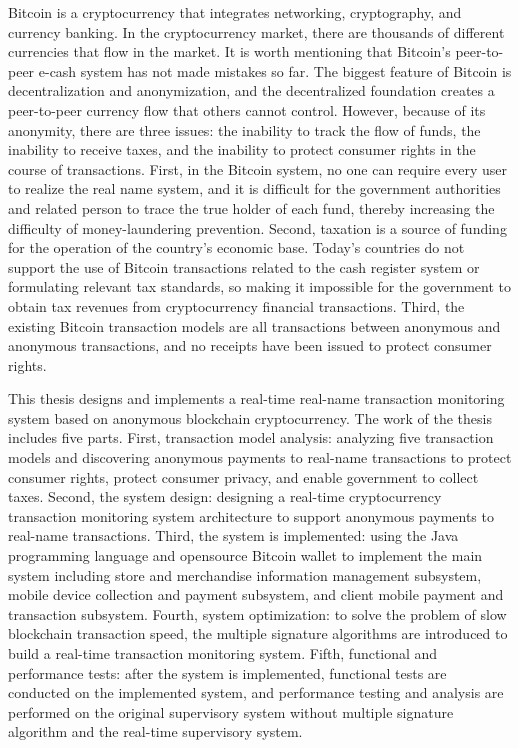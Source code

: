 \begin{eabstract}
	Bitcoin is a cryptocurrency that integrates networking, cryptography, and currency banking. In the cryptocurrency market, there are thousands of different currencies that flow in the market. It is worth mentioning that Bitcoin's peer-to-peer e-cash system has not made mistakes so far. The biggest feature of Bitcoin is decentralization and anonymization, and the decentralized foundation creates a peer-to-peer currency flow that others cannot control. However, because of its anonymity, there are three issues: the inability to track the flow of funds, the inability to receive taxes, and the inability to protect consumer rights in the course of transactions. First, in the Bitcoin system, no one can require every user to realize the real name system, and it is difficult for the government authorities and related person to trace the true holder of each fund, thereby increasing the difficulty of money-laundering prevention. Second, taxation is a source of funding for the operation of the country’s economic base. Today’s countries do not support the use of Bitcoin transactions related to the cash register system or formulating relevant tax standards, so making it impossible for the government to obtain tax revenues from cryptocurrency financial transactions. Third, the existing Bitcoin transaction models are all transactions between anonymous and anonymous transactions, and no receipts have been issued to protect consumer rights.

	This thesis designs and implements a real-time real-name transaction monitoring system based on anonymous blockchain cryptocurrency. The work of the thesis includes five parts. First, transaction model analysis: analyzing five transaction models and discovering anonymous payments to real-name transactions to protect consumer rights, protect consumer privacy, and enable government to collect taxes. Second, the system design: designing a real-time cryptocurrency transaction monitoring system architecture to support anonymous payments to real-name transactions. Third, the system is implemented: using the Java programming language and opensource Bitcoin wallet to implement the main system including store and merchandise information management subsystem, mobile device collection and payment subsystem, and client mobile payment and transaction subsystem. Fourth, system optimization: to solve the problem of slow blockchain transaction speed, the multiple signature algorithms are introduced to build a real-time transaction monitoring system. Fifth, functional and performance tests: after the system is implemented, functional tests are conducted on the implemented system, and performance testing and analysis are performed on the original supervisory system without multiple signature algorithm and the real-time supervisory system.


\end{eabstract}
